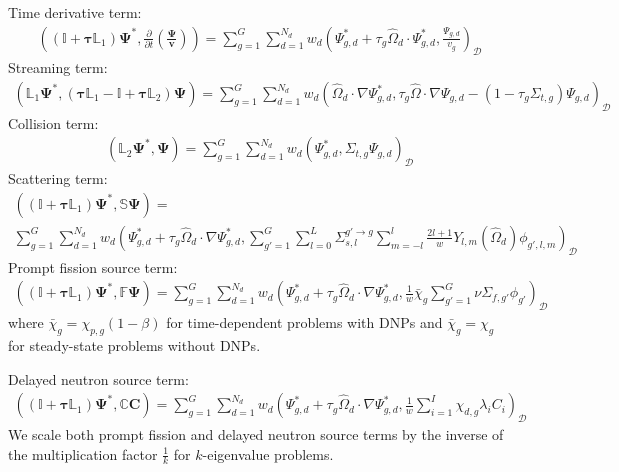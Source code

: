 \noindent Time derivative term:
%
\begin{gather}
  \left(\left(\mathbb{I}+\bm{\tau}\mathbb{L}_1\right)\bm{\Psi}^*,
  \frac{\partial}{\partial t}\left(\frac{\bm{\Psi}}{\bm{v}}\right)\right) =
  \sum^G_{g=1}\sum^{N_d}_{d=1}w_d\left(\Psi^*_{g,d}+\tau_g\hat{\Omega}_d\cdot\Psi^*_{g,d},
  \frac{\Psi_{g,d}}{v_g}\right)_\mathcal{D} \label{eq:time-derivative}
\end{gather}
%
Streaming term:
%
\begin{gather}
  \left(\mathbb{L}_1\bm{\Psi}^*,
  \left(\bm{\tau}\mathbb{L}_1-\mathbb{I}+\bm{\tau}\mathbb{L}_2\right)\bm{\Psi}\right) =
  \sum^G_{g=1}\sum^{N_d}_{d=1}w_d\left(\hat{\Omega}_d\cdot\nabla\Psi^*_{g,d},\tau_g\hat{\Omega}
  \cdot\nabla\Psi_{g,d}-(1-\tau_g\Sigma_{t,g})\Psi_{g,d}\right)_\mathcal{D}
\end{gather}
%
Collision term:
%
\begin{gather}
  \left(\mathbb{L}_2\bm{\Psi}^*,\bm{\Psi}\right) =
  \sum^G_{g=1}\sum^{N_d}_{d=1}w_d\left(\Psi^*_{g,d},\Sigma_{t,g}\Psi_{g,d}\right)_\mathcal{D}
\end{gather}
%
Scattering term:
%
\begin{multline}
  \left(\left(\mathbb{I}+\bm{\tau}\mathbb{L}_1\right)\bm{\Psi}^*,\mathbb{S}\bm{\Psi}\right) = \\
  \sum^G_{g=1}\sum^{N_d}_{d=1}w_d\left(\Psi^*_{g,d}+\tau_g\hat{\Omega}_d\cdot\nabla\Psi^*_{g,d},
  \sum^G_{g'=1}\sum^L_{l=0}\Sigma^{g'\rightarrow g}_{s,l}\sum^l_{m=-l}
  \frac{2l+1}{w}Y_{l,m}(\hat{\Omega}_d)\phi_{g',l,m}\right)_\mathcal{D}
\end{multline}
%
Prompt fission source term:
%
\begin{gather}
  \left(\left(\mathbb{I}+\bm{\tau}\mathbb{L}_1\right)\bm{\Psi}^*,\mathbb{F}\bm{\Psi}\right) =
  \sum^G_{g=1}\sum^{N_d}_{d=1}w_d\left(\Psi^*_{g,d}+\tau_g\hat{\Omega}_d\cdot\nabla\Psi^*_{g,d},
  \frac{1}{w}\bar{\chi}_g\sum^G_{g'=1}\nu\Sigma_{f,g'}\phi_{g'}\right)_\mathcal{D}
\end{gather}
%
where $\bar{\chi}_g=\chi_{p,g}\left(1-\beta\right)$ for time-dependent problems with \glspl{DNP}
and $\bar{\chi}_g=\chi_{g}$ for steady-state problems without \glspl{DNP}.

\noindent Delayed neutron source term:
%
\begin{gather}
  \left(\left(\mathbb{I}+\bm{\tau}\mathbb{L}_1\right)\bm{\Psi}^*,\mathbb{C}\bm{C}\right) =
  \sum^G_{g=1}\sum^{N_d}_{d=1}w_d\left(\Psi^*_{g,d}+\tau_g\hat{\Omega}_d\cdot\nabla\Psi^*_{g,d},
  \frac{1}{w}\sum ^I_{i=1}\chi_{d,g}\lambda_i C_i\right)_\mathcal{D}
\end{gather}
%
We scale both prompt fission and delayed neutron source terms by the inverse of the
multiplication factor $\frac{1}{k}$ for $k$-eigenvalue problems.

